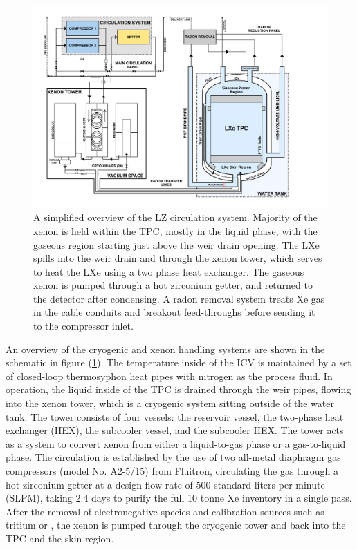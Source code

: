 %
\begin{figure}[b!]
    \centering
    \includegraphics[scale=0.30]{Chapter_2/Figures/LZ_Xenon_Circulation.png}
    \caption[Schematics of the LZ circulation system, detailing TPC, the xenon tower and the compressor systems.]%
    {A simplified overview of the LZ circulation system. Majority of the xenon is held within the TPC, mostly in the liquid phase, with the gaseous region starting just above the weir drain opening. The LXe spills into the weir drain and through the xenon tower, which serves to heat the LXe using a two phase heat exchanger. The gaseous xenon is pumped through a hot zirconium getter, and returned to the detector after condensing. A radon removal system treats Xe gas in the cable conduits and breakout feed-throughs before sending it to the compressor inlet.}
    \label{fig:circulation_diagram}
\end{figure}
%

An overview of the cryogenic and xenon handling systems are shown in the schematic in figure (\ref{fig:circulation_diagram}). The temperature inside of the ICV is maintained by a set of closed-loop thermosyphon heat pipes with nitrogen as the process fluid. In operation, the liquid inside of the TPC is drained through the weir pipes, flowing into the xenon tower, which is a cryogenic system sitting outside of the water tank. The tower consists of four vessels: the reservoir vessel, the two-phase heat exchanger (HEX), the subcooler vessel, and the subcooler HEX. The tower acts as a system to convert xenon from either a liquid-to-gas phase or a gas-to-liquid phase. The circulation is established by the use of two all-metal diaphragm gas compressors (model No. A2-5/15) from Fluitron, circulating the gas through a hot zirconium getter at a design flow rate of 500 standard liters per minute (SLPM), taking 2.4 days to purify the full 10 tonne Xe inventory in a single pass. After the removal of electronegative species and calibration sources such as tritium or \cof{}, the xenon is pumped through the cryogenic tower and back into the TPC and the skin region.


